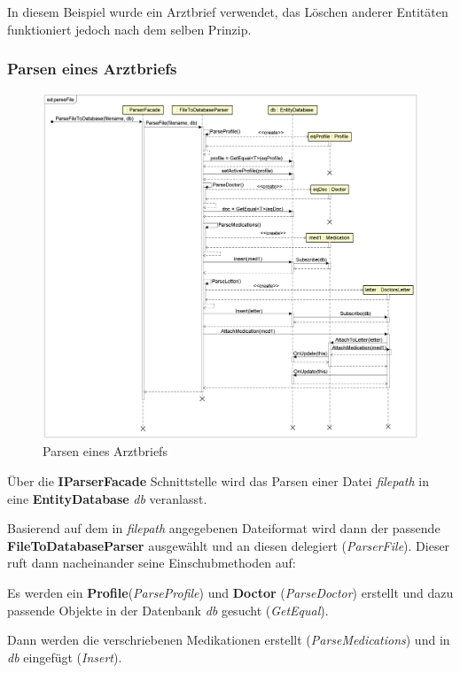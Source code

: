 \documentclass[a4paper]{scrreprt}
\begin{document}
In diesem Beispiel wurde ein Arztbrief verwendet, das Löschen anderer Entitäten funktioniert jedoch nach dem selben Prinzip.

\subsubsection{Parsen eines Arztbriefs}
\begin{figure}[H]
\centering
\includegraphics[width=0.75\textheight]{graphics/Klassendiagramme/Model/ParseFile.png}
\caption{Parsen eines Arztbriefs}
\end{figure}
Über die \textbf{IParserFacade} Schnittstelle wird das Parsen einer Datei \textit{filepath} in eine \textbf{EntityDatabase} \textit{db} veranlasst.

Basierend auf dem in \textit{filepath} angegebenen Dateiformat wird dann der passende \textbf{FileToDatabaseParser} ausgewählt und an diesen delegiert (\textit{ParserFile}). Dieser ruft dann nacheinander seine Einschubmethoden auf:

Es werden ein \textbf{Profile}(\textit{ParseProfile}) und \textbf{Doctor} (\textit{ParseDoctor}) erstellt und dazu passende Objekte in der Datenbank \textit{db} gesucht (\textit{GetEqual}). 

Dann werden die verschriebenen Medikationen erstellt (\textit{ParseMedications}) und in \textit{db} eingefügt (\textit{Insert}). 
\end{document}
